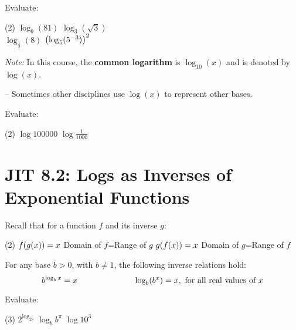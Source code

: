 \documentclass[mathNotesPreamble]{subfiles}
\begin{document}
  \begin{center}
  \end{center}
  \begin{ex*}
    Evaluate:
    \begin{extasks}(2)
      \task $\log_9(81)$
      \task $\log_3(\sqrt3)$\\
      \task $\log_{\frac{1}{2}}(8)$
      \task $\parens{\log_5(5\inv[3])}^2$\\
    \end{extasks}
  \end{ex*}
  \pagebreak
  
  \textit{Note:} In this course, the \textbf{common logarithm} is $\log_{10}(x)$ and is denoted by $\log(x)$. 
  
  -- Sometimes other disciplines use $\log(x)$ to represent other bases.
  \begin{ex*}
    Evaluate:
    \begin{extasks}(2)
      \task $\log 100000$
      \task $\log \frac{1}{1000}$\\
    \end{extasks}
  \end{ex*}
\section{JIT 8.2: Logs as Inverses of Exponential Functions}
  Recall that for a function $f$ and its inverse $g$:
  \begin{tasks}[style=itemize](2)
    \task $f\parens{g(x)}=x$
    \task Domain of $f$=Range of $g$
    \task $g\parens{f(x)}=x$
    \task Domain of $g$=Range of $f$\\
  \end{tasks}

  \begin{thmBox*}
    For any base $b>0$, with $b\neq 1$, the following inverse relations hold:
      $$b^{\log_bx}=x \hspace*{0.2\linewidth}\log_b(b^x)=x,\text{ for all real values of }x$$
  \end{thmBox*}

  \begin{ex*}
    Evaluate:
    \begin{extasks}(3)
      \task $2^{\log_28}$
      \task $\log_bb^\pi$
      \task $\log10^3$
    \end{extasks}
  \end{ex*}
  \vfill
  \pagebreak
  
\end{document}
